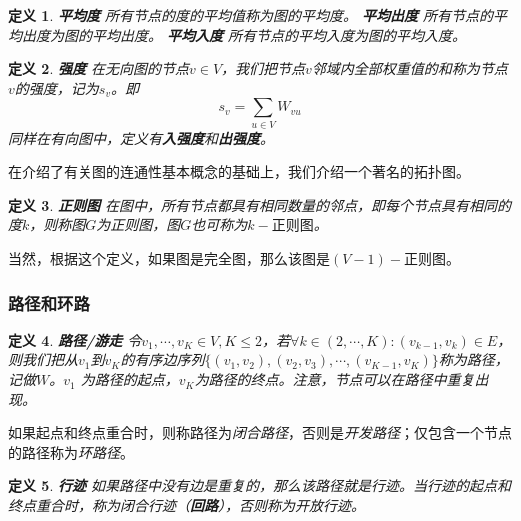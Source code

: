 \documentclass{ctexart}
\newtheorem{Definition}{\hspace{2em}定义}[section]
\begin{document}
                \begin{Definition}
                    \textbf{平均度} 所有节点的度的平均值称为图的平均度。
                    \textbf{平均出度} 所有节点的平均出度为图的平均出度。
                    \textbf{平均入度} 所有节点的平均入度为图的平均入度。
                \end{Definition}
                \begin{Definition}
                    \textbf{强度} 在无向图的节点$v\in V$，我们把节点$v$邻域内全部权重值的和称为节点$v$的强度，记为$s_v$。即
                    \begin{equation}
                        s_v = \sum_{u\in V} W_{vu}
                    \end{equation}
                    同样在有向图中，定义有\textbf{入强度}和\textbf{出强度}。
                \end{Definition}

                在介绍了有关图的连通性基本概念的基础上，我们介绍一个著名的拓扑图。
                \begin{Definition}
                    \textbf{正则图} 在图中，所有节点都具有相同数量的邻点，即每个节点具有相同的度$k$，则称图$G$为正则图，图$G$也可称为$k-\text{正则图}$。
                \end{Definition}
                当然，根据这个定义，如果图是完全图，那么该图是$(V-1)-\text{正则图}$。
            \subsubsection{路径和环路}
                \begin{Definition}
                    \textbf{路径/游走} 令$v_1,\cdots,v_K \in V,K\le 2$，若$\forall k \in (2,\cdots,K):(v_{k-1},v_k)\in E$，则我们把从$v_1$到$v_K$的有序边序列$\{(v_1,v_2),(v_2,v_3),\cdots,(v_{K-1},v_K)\}$称为路径，记做$W$。$v_1$ 为路径的起点，$v_K$为路径的终点。注意，节点可以在路径中重复出现。
                \end{Definition}
                如果起点和终点重合时，则称路径为\emph{闭合路径}，否则是\emph{开发路径}；仅包含一个节点的路径称为\emph{环路径}。

                \begin{Definition}
                    \textbf{行迹} 如果路径中没有边是重复的，那么该路径就是行迹。当行迹的起点和终点重合时，称为闭合行迹（\textbf{回路}），否则称为开放行迹。
                \end{Definition}
\end{document}
